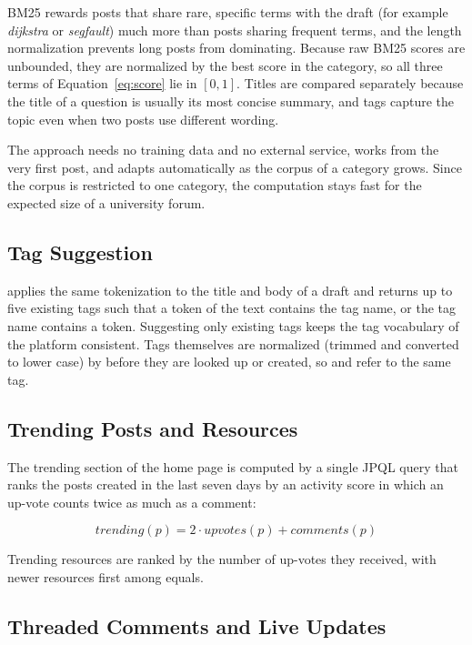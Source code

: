 BM25 rewards posts that share rare, specific terms with the draft (for example
\emph{dijkstra} or \emph{segfault}) much more than posts sharing frequent terms, and the
length normalization prevents long posts from dominating. Because raw BM25 scores are
unbounded, they are normalized by the best score in the category, so all three terms of
Equation~\ref{eq:score} lie in $[0,1]$. Titles are compared separately because the title
of a question is usually its most concise summary, and tags capture the topic even when
two posts use different wording.

The approach needs no training data and no external service, works from the very first
post, and adapts automatically as the corpus of a category grows. Since the corpus is
restricted to one category, the computation stays fast for the expected size of a
university forum.

\subsection{Tag Suggestion}

 applies the same tokenization to the title and body of a
draft and returns up to five existing tags such that a token of the text contains the
tag name, or the tag name contains a token. Suggesting only existing tags keeps the tag
vocabulary of the platform consistent. Tags themselves are normalized (trimmed and
converted to lower case) by  before they are looked up or created, so
 and  refer to the same tag.

\subsection{Trending Posts and Resources}

The trending section of the home page is computed by a single JPQL query that ranks the
posts created in the last seven days by an activity score in which an up-vote counts
twice as much as a comment:

\begin{equation}
  \mathit{trending}(p) = 2 \cdot \mathit{upvotes}(p) + \mathit{comments}(p)
\end{equation}

Trending resources are ranked by the number of up-votes they received, with newer
resources first among equals.

\subsection{Threaded Comments and Live Updates}

